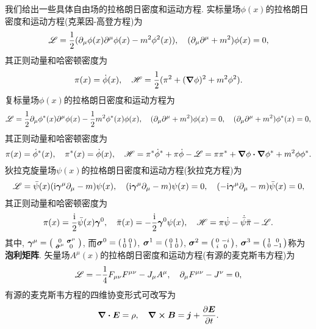 我们给出一些具体自由场的拉格朗日密度和运动方程. 实标量场$ \phi(x) $的拉格朗日密度和运动方程(克莱因-高登方程)为
\begin{equation*}
    \mathscr{L} = \frac{1}{2} (\partial_{\mu} \phi(x) \partial^{\mu} \phi(x) - m^2 \phi^2(x)), \quad (\partial_{\mu} \partial^{\mu} + m^2) \phi(x)=0,
\end{equation*}
其正则动量和哈密顿密度为
\begin{equation*}
    \pi(x)=\dot{\phi}(x), \quad \mathscr{H} = \frac{1}{2} (\pi^2 + (\grad \phi)^2 + m^2 \phi^2).
\end{equation*}
复标量场$ \phi(x) $的拉格朗日密度和运动方程为
\begin{equation*}
    \mathscr{L} = \frac{1}{2} \partial_{\mu} \phi^*(x) \partial^{\mu} \phi(x) - \frac{1}{2} m^2 \phi^*(x)\phi(x), \quad (\partial_{\mu} \partial^{\mu} + m^2) \phi(x)=0, \quad (\partial_{\mu} \partial^{\mu} + m^2) \phi^*(x)=0,
\end{equation*}
其正则动量和哈密顿密度为
\begin{equation*}
    \pi(x)=\dot{\phi}^*(x), \quad \pi^*(x)=\dot{\phi}(x), \quad \hamiden = \pi^* \dot{\phi}^* + \pi \dot{\phi} - \lagrden = \pi\pi^* + \grad\phi \vdot \grad\phi^* + m^2 \phi \phi^*.
\end{equation*}
狄拉克旋量场$ \psi(x) $的拉格朗日密度和运动方程(狄拉克方程)为
\begin{equation*}
    \mathscr{L} = \bar{\psi}(x) (\mathrm{i} \vb*{\gamma}^{\mu} \partial_{\mu} - m) \psi(x), \quad (\mathrm{i} \vb*{\gamma}^{\mu} \partial_{\mu} - m) \psi(x) = 0, \quad (-\mathrm{i} \vb*{\gamma}^{\mu} \partial_{\mu} - m) \bar{\psi}(x) = 0,
\end{equation*}
其正则动量和哈密顿密度为
\begin{equation*}
    \pi(x)=\frac{\mathrm{i}}{2} \bar{\psi}(x) \vb*{\gamma}^0, \quad \bar{\pi}(x)=-\frac{\mathrm{i}}{2} \vb*{\gamma}^0 \psi(x), \quad \mathscr{H} = \pi \dot{\psi} - \dot{\bar{\psi}} \bar{\pi} - \mathscr{L}.
\end{equation*}
其中, $ \vb*{\gamma}^{\mu} = \smqty(\smqty{0 & \vb*{\sigma}^{\mu} \\ \bar{\vb*{\sigma}}^{\mu} & 0}) $, 而$ \vb*{\sigma}^{0} = \smqty(\pmat{0}) $, $ \vb*{\sigma}^{1} = \smqty(\pmat{1}) $, $ \vb*{\sigma}^{2} = \smqty(\pmat{2}) $, $ \vb*{\sigma}^{3} = \smqty(\pmat{3}) $称为\textbf{泡利矩阵}. 矢量场$ A^{\mu}(x) $的拉格朗日密度和运动方程(有源的麦克斯韦方程)为
\begin{equation*}
    \mathscr{L} = -\frac{1}{4} F_{\mu\nu} F^{\mu\nu} - J_{\mu} A^{\mu}, \quad \partial_{\mu} F^{\mu\nu} - J^{\nu} = 0,
\end{equation*}
有源的麦克斯韦方程的四维协变形式可改写为
\begin{equation*}
    \div{\vb*{E}} = \rho, \quad \curl{\vb*{B}} = \vb*{j} + \pdv{\vb*{E}}{t}.
\end{equation*}

